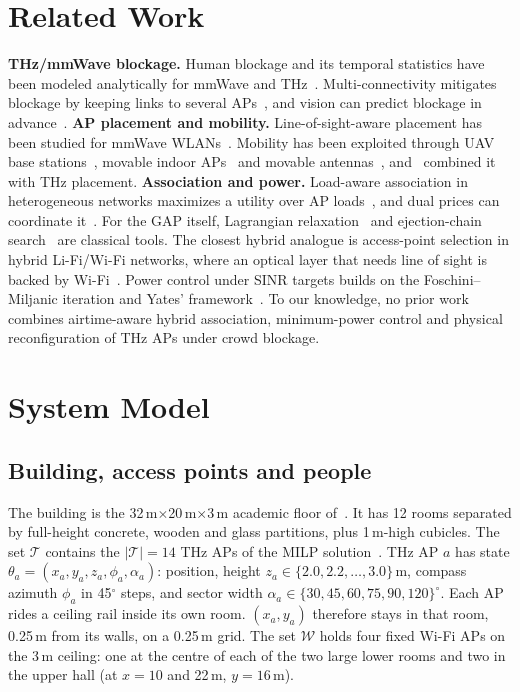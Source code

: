 \documentclass[conference]{IEEEtran}
\begin{document}
\section{Related Work}
\textbf{THz/mmWave blockage.}
Human blockage and its temporal statistics have been modeled analytically for mmWave and THz~\cite{gapeyenko2017temporal,petrov2017interference}.
Multi-connectivity mitigates blockage by keeping links to several APs~\cite{petrov2017multiconn}, and vision can predict blockage in advance~\cite{charan2021vision}.
\textbf{AP placement and mobility.}
Line-of-sight-aware placement has been studied for mmWave WLANs~\cite{liu2022los}.
Mobility has been exploited through UAV base stations~\cite{alzenad2017uav}, movable indoor APs~\cite{murakami2018movable} and movable antennas~\cite{zhu2024movable}, and~\cite{anon2026milp,anon2026teramove} combined it with THz placement.
\textbf{Association and power.}
Load-aware association in heterogeneous networks maximizes a utility over AP loads~\cite{ye2013association}, and dual prices can coordinate it~\cite{shen2014pricing}.
For the GAP itself, Lagrangian relaxation~\cite{fisher1986multiplier} and ejection-chain search~\cite{yagiura2004ejection} are classical tools.
The closest hybrid analogue is access-point selection in hybrid Li-Fi/Wi-Fi networks, where an optical layer that needs line of sight is backed by Wi-Fi~\cite{wu2017lifi}.
Power control under SINR targets builds on the Foschini--Miljanic iteration and Yates' framework~\cite{foschini1993power,yates1995framework}.
To our knowledge, no prior work combines airtime-aware hybrid association, minimum-power control and physical reconfiguration of THz APs under crowd blockage.

\section{System Model}\label{sec:model}
\subsection{Building, access points and people}
The building is the 32\,m$\times$20\,m$\times$3\,m academic floor of~\cite{anon2026milp,anon2026teramove}.
It has 12 rooms separated by full-height concrete, wooden and glass partitions, plus 1\,m-high cubicles.
The set $\mathcal{T}$ contains the $|\mathcal{T}|=14$ THz APs of the MILP solution~\cite[Fig.~1]{anon2026milp}.
THz AP $a$ has state $\theta_a=(x_a,y_a,z_a,\phi_a,\alpha_a)$: position, height $z_a\in\{2.0,2.2,\dots,3.0\}$\,m, compass azimuth $\phi_a$ in 45$^\circ$ steps, and sector width $\alpha_a\in\{30,45,60,75,90,120\}^\circ$.
Each AP rides a ceiling rail inside its own room.
$(x_a,y_a)$ therefore stays in that room, 0.25\,m from its walls, on a 0.25\,m grid.
The set $\mathcal{W}$ holds four fixed Wi-Fi APs on the 3\,m ceiling: one at the centre of each of the two large lower rooms and two in the upper hall (at $x=10$ and 22\,m, $y=16$\,m).
\end{document}
